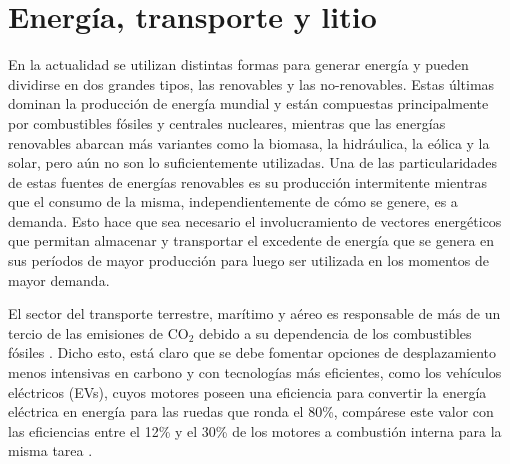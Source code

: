 \section{Energía, transporte y litio}

En la actualidad se utilizan distintas formas para generar energía y pueden 
dividirse en dos grandes tipos, las renovables y las no-renovables. Estas últimas
dominan la producción de energía mundial y están compuestas principalmente por 
combustibles fósiles y centrales nucleares, mientras que las energías renovables
abarcan más variantes como la biomasa, la hidráulica, la eólica y la solar, pero 
aún no son lo suficientemente utilizadas. Una de las particularidades de estas 
fuentes de energías renovables es su producción intermitente mientras que el 
consumo de la misma, independientemente de cómo se genere, es a demanda. Esto 
hace que sea necesario el involucramiento de vectores energéticos que permitan 
almacenar y transportar el excedente de energía que se genera en sus períodos de 
mayor producción para luego ser utilizada en los momentos de mayor demanda.

El sector del transporte terrestre, marítimo y aéreo es responsable de más de un 
tercio de las emisiones de CO$_2$ debido a su dependencia de los combustibles 
fósiles \cite{IEA}. Dicho esto, está claro que se debe fomentar opciones de desplazamiento menos intensivas
en carbono y con tecnologías más eficientes, como los vehículos eléctricos (EVs),
cuyos motores poseen una eficiencia para convertir la energía eléctrica en energía para las ruedas que ronda el 80\%, compárese este valor con las
eficiencias entre el 12\% y el 30\% de los motores a combustión interna para la misma tarea \cite{DOE}.

